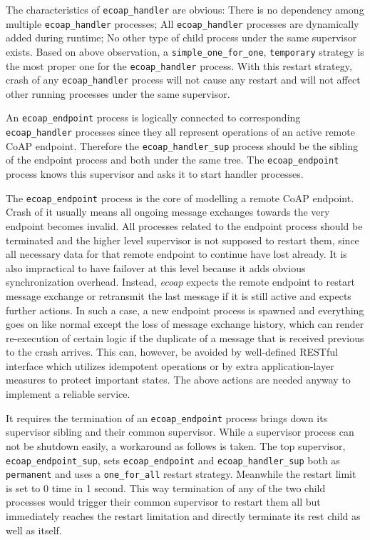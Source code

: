 The characteristics of \verb|ecoap_handler| are obvious: There is no dependency among multiple \verb|ecoap_handler| processes; All \verb|ecoap_handler| processes are dynamically added during runtime; No other type of child process under the same supervisor exists. Based on above observation, a \verb|simple_one_for_one|, \verb|temporary| strategy is the most proper one for the \verb|ecoap_handler| process. With this restart strategy, crash of any \verb|ecoap_handler| process will not cause any restart and will not affect other running processes under the same supervisor.

An \verb|ecoap_endpoint| process is logically connected to corresponding \verb|ecoap_handler| processes since they all represent operations of an active remote CoAP endpoint. Therefore the \verb|ecoap_handler_sup| process should be the sibling of the endpoint process and both under the same tree. The \verb|ecoap_endpoint| process knows  this supervisor and asks it to start handler processes.

The \verb|ecoap_endpoint| process is the core of modelling a remote CoAP endpoint. Crash of it usually means all ongoing message exchanges towards the very endpoint becomes invalid. All processes related to the endpoint process should be terminated and the higher level supervisor is not supposed to restart them, since all necessary data for that remote endpoint to continue have lost already. It is also impractical to have failover at this level because it adds obvious synchronization overhead. Instead, \textit{ecoap} expects the remote endpoint to restart message exchange or retransmit the last message if it is still active and expects further actions. In such a case, a new endpoint process is spawned and everything goes on like normal except the loss of message exchange history, which can render re-execution of certain logic if the duplicate of a message that is received previous to the crash arrives. This can, however, be avoided by well-defined RESTful interface which utilizes idempotent operations or by extra application-layer measures to protect important states. The above actions are needed anyway to implement a reliable service.

It requires the termination of an \verb|ecoap_endpoint| process brings down its supervisor sibling and their common supervisor. While a supervisor process can not be shutdown easily, a workaround as follows is taken. The top supervisor, \verb|ecoap_endpoint_sup|, sets \verb|ecoap_endpoint| and \verb|ecoap_handler_sup| both as \verb|permanent| and uses a \verb|one_for_all| restart strategy. Meanwhile the restart limit is set to 0 time in 1 second. This way termination of any of the two child processes would trigger their common supervisor to restart them all but immediately reaches the restart limitation and directly terminate its rest child as well as itself. 

